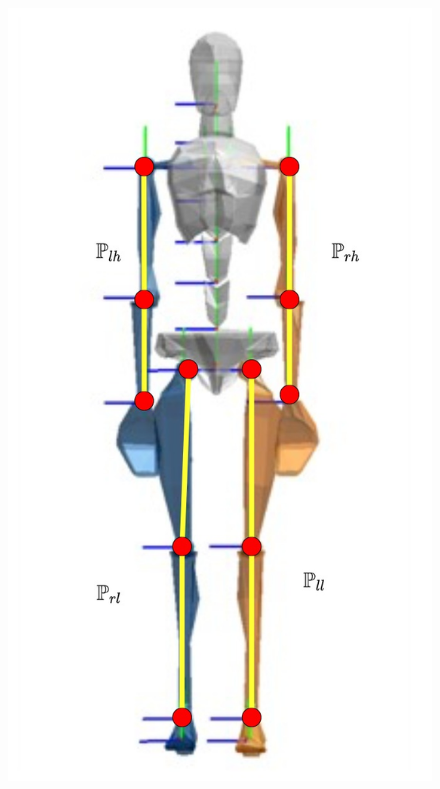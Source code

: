 \begin{figure}[h!]
    \centering
    \includegraphics[scale=0.25]{images/flowchart-xsens-pendulum.jpg}\hfill

\end{figure}
